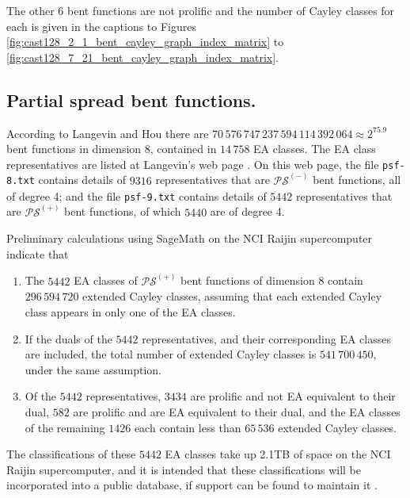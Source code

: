 The other 6 bent functions are not prolific and the number of Cayley classes for each is given in the captions to
Figures \ref{fig:cast128_2_1_bent_cayley_graph_index_matrix} to \ref{fig:cast128_7_21_bent_cayley_graph_index_matrix}.
\subsection{Partial spread bent functions.}

According to Langevin and Hou \cite{LanH11counting}
there are $70\,576\,747\,237\,594\,114\,392\,064 \approx 2^{75.9}$  bent functions in
dimension 8,
contained in $14\,758$ EA classes.
The EA class representatives are listed at Langevin's web page \cite{Lan10psf}.
On this web page,
the file \texttt{psf-8.txt} contains details of $9316$ representatives that are
$\mathcal{PS}^{(-)}$ bent functions, all of degree 4; and
the file \texttt{psf-9.txt} contains details of $5442$ representatives that are
$\mathcal{PS}^{(+)}$ bent functions, of which $5440$ are of degree 4.

Preliminary calculations using SageMath on the NCI Raijin supercomputer indicate that
\begin{enumerate}
 \item
The $5442$ EA classes of $\mathcal{PS}^{(+)}$ bent functions of dimension 8
contain $296\,594\,720$ extended Cayley classes, assuming that each extended Cayley class appears in only one of the EA classes.
 \item
If the duals of the $5442$ representatives, and their corresponding EA classes are included,
the total number of extended Cayley classes is $541\,700\,450$, under the same assumption.
 \item
Of the $5442$ representatives,
$3434$ are prolific and not EA equivalent to their dual,
$582$ are prolific and are EA equivalent to their dual,
and the EA classes of the remaining $1426$ each contain less than $65\,536$ extended Cayley classes.
\end{enumerate}
The classifications of these $5442$ EA classes take up 2.1TB of space on the NCI Raijin supercomputer,
and it is intended that these classifications will be incorporated into a public database, if support can be found to maintain it
\cite{Leo18Database}.

